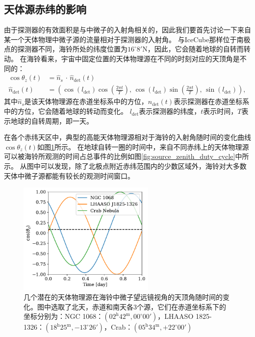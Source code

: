\subsection{天体源赤纬的影响}

由于探测器的有效面积是与中微子的入射角相关的，因此我们要首先讨论一下来自某一个天体物理中微子源的流量相对于探测器的入射角。
与IceCube那样位于南极点的探测器不同，海铃所处的纬度位置为$16^\circ 8' \mathrm{N}$，因此，它会随着地球的自转而转动。
在海铃看来，宇宙中固定位置的天体物理源在不同的时刻对应的天顶角是不同的：
\begin{equation}
\begin{aligned}
    \cos\theta_z(t) &= \hat{n}_s \, \cdot \, \hat{n}_\mathrm{det}(t) \\
    \hat{n}_\mathrm{det}(t) &= \left(\cos(l_\mathrm{det})\cos(\frac{2\pi t}{T}),\,
    \cos(l_\mathrm{det})\sin(\frac{2\pi t}{T}),\, 
    \sin(l_\mathrm{det}) \right) ,
\end{aligned}
\end{equation}
其中$\hat{n}_s$是该天体物理源在赤道坐标系中的方位，$\hat{n}_\mathrm{det}(t)$表示探测器在赤道坐标系中的方位，它会随着地球的转动而变化。
$l_\mathrm{det}$表示探测器的纬度，$t$表示时间，$T$表示地球的自转周期，即一天。

在各个赤纬天区中，典型的高能天体物理源相对于海铃的入射角随时间的变化曲线$\cos\theta_z(t)$如图\ref{fig:source_zenith_time_curve}所示。
在地球自转一圈的时间中，来自不同赤纬上的天体物理源可以被海铃所观测的时间占总事件的比例如图\ref{fig:source_zenith_duty_cycle}中所示。
从图中可以发现，除了北极点附近赤纬范围内的少数区域外，海铃对大多数天体中微子源都能有较长的观测时间窗口。

\begin{figure}[!htb]%
    \centering
    \includegraphics[width=0.60\textwidth]{img/source_zenith_time_curve.pdf}
    \caption{几个潜在的天体物理源在海铃中微子望远镜视角的天顶角随时间的变化。图中选取了北天，赤道和南天各3个源，它们在赤道坐标系下的坐标分别为：NGC 1068：$(\mathrm{02^h 42^m, 00^\circ 00′})$，LHAASO 1825-1326：$(\mathrm{18^h 25^m, -13^\circ 26′})$，Crab：$(\mathrm{05^h 34^m, +22^\circ 00'})$}
    \label{fig:source_zenith_time_curve}
\end{figure}

